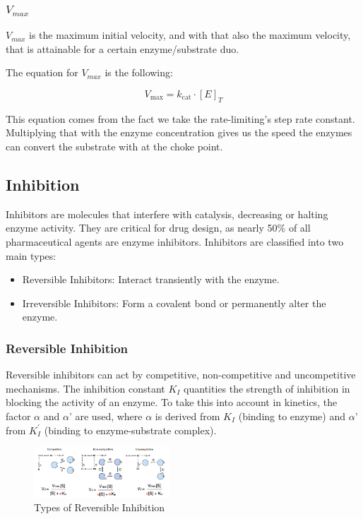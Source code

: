 \documentclass[../main.tex]{subfiles}
\begin{document}
\subsubsection{$V_{max}$}

$V_{max}$ is the maximum initial velocity, and with that also the maximum velocity, that is attainable for a certain enzyme/substrate duo.

The equation for $V_{max}$ is the following:

\begin{equation}
	V_{\max} = k_{\text{cat}} \cdot [E]_T
\end{equation}

This equation comes from the fact we take the rate-limiting's step rate constant. Multiplying that with the enzyme concentration gives us the speed the enzymes can convert the substrate with at the choke point.

\subsection{\gls{Inhibition}}

Inhibitors are molecules that interfere with catalysis, decreasing or halting enzyme activity. They are critical for drug design, as nearly 50\% of all pharmaceutical agents are enzyme inhibitors. Inhibitors are classified into two main types:
\begin{itemize}
	\item Reversible Inhibitors: Interact transiently with the enzyme.
	\item Irreversible Inhibitors: Form a covalent bond or permanently alter the enzyme.
\end{itemize}

\subsubsection{\gls{Reversible Inhibition}}

Reversible inhibitors can act by competitive, non-competitive and uncompetitive mechanisms. The inhibition constant $K_{I}$ quantities the strength of inhibition in blocking the activity of an enzyme. To take this into account in kinetics, the factor $\alpha$ and $\alpha$' are used, where $\alpha$ is derived from $K_{I}$ (binding to enzyme) and $\alpha$' from $K^{'}_{I}$ (binding to enzyme-substrate complex).

\begin{figure}[h]
	\centering
	\includegraphics[width=0.45\textwidth]{Reversible_schematic}
	\caption{Types of Reversible Inhibition}
\end{figure}
\end{document}
